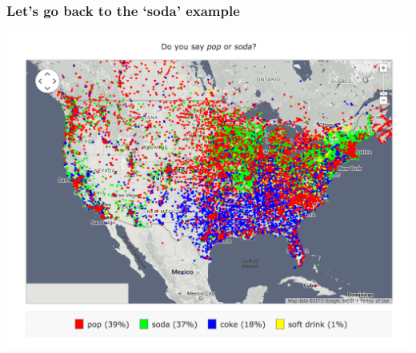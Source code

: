 \documentclass{beamer} %
\newcommand{\1}{\mathbb{1}}
\begin{document}
\begin{frame}[t]\frametitle{Let's go back to the `soda' example}
\includegraphics[scale = 0.35]{./visualization/sodapopcoke_original.png}
\end{frame}
\end{document}
